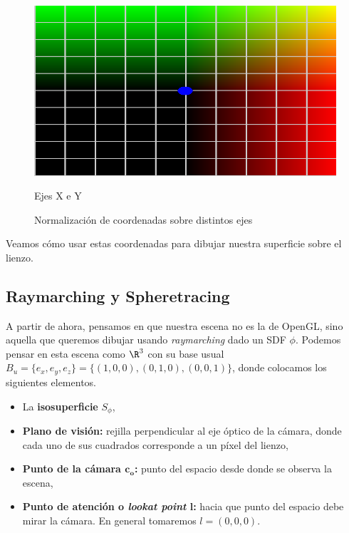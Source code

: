 \begin{figure}[htbp]
    \medskip
    
    \begin{minipage}[b]{0.45\textwidth}
        \centering
        \includegraphics[width=\textwidth]{Plantilla-TFG-master/img/normXY.png}
        \caption{Ejes X e Y}
    \end{minipage}
    
    \caption{Normalización de coordenadas sobre distintos ejes}
    \label{fig:uv}
\end{figure}

Veamos  cómo usar estas coordenadas para dibujar nuestra superficie sobre el lienzo.

\subsection{Raymarching y Spheretracing}
A partir de ahora, pensamos en que nuestra escena no es la de OpenGL, sino aquella que queremos dibujar usando \textit{raymarching} dado un SDF $\phi$. Podemos pensar en esta escena como $\R^3$ con su base usual $B_u = \{e_x,e_y,e_z\} = \{(1,0,0),(0,1,0),(0,0,1)\}$, donde colocamos los siguientes elementos.
\begin{itemize}
    \item La \textbf{isosuperficie} $S_{\phi}$,
    \item \textbf{Plano de visión:} rejilla perpendicular al eje óptico de la cámara, donde cada uno de sus cuadrados corresponde a un píxel del lienzo,
    \item \textbf{Punto de la cámara $\boldsymbol{c_o}$:} punto del espacio desde donde se observa la escena,
    \item \textbf{Punto de atención o \textit{lookat point} $\boldsymbol{l}$:} hacia que punto del espacio debe mirar la cámara. En general tomaremos $l=(0,0,0)$.
\end{itemize}

